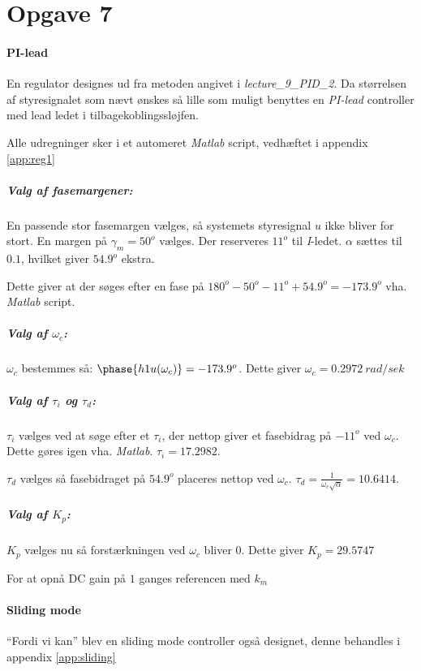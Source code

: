 \section{Opgave 7}
\paragraph{ PI-lead }
En regulator designes ud fra metoden angivet i \emph{lecture\_9\_PID\_2}. Da
størrelsen af styresignalet som nævt ønskes så lille som muligt benyttes en
\emph{PI-lead} controller med lead ledet i tilbagekoblingssløjfen.

Alle udregninger sker i et automeret \emph{Matlab} script, vedhæftet i appendix
\ref{app:reg1}

\subparagraph{Valg af fasemargener:}
	En passende stor fasemargen vælges, så systemets styresignal $u$ ikke bliver
	for stort. En margen på $\gamma_m = 50^o$ vælges.
	Der reserveres $11^o$ til \emph{I}-ledet.
	$\alpha$ sættes til $0.1$, hvilket giver $54.9^o$ ekstra.
	
	Dette giver at der søges efter en fase på $180^o - 50^o - 11^o + 54.9^o =
	-173.9^o$ vha. \emph{Matlab} script.
\subparagraph{Valg af $\omega_c$:}
	$\omega_c$ bestemmes så: $\phase{h1u(\omega_c)} = -173.9^o$. Dette giver
	$\omega_c =  0.2972~rad/sek$
\subparagraph{Valg af $\tau_i$ og $\tau_d$:}
	$\tau_i$ vælges ved at søge efter et $\tau_i$, der nettop giver et fasebidrag
	på $-11^o$ ved $\omega_c$. Dette gøres igen vha. \emph{Matlab}. $\tau_i =
	17.2982$.
	
	$\tau_d$ vælges så fasebidraget på $54.9^o$ placeres nettop ved $\omega_c$.
	$\tau_d = \frac{1}{\omega_c \sqrt{\alpha}} = 10.6414$.
\subparagraph{Valg af $K_p$:}
	$K_p$ vælges nu så forstærkningen ved $\omega_c$ bliver 0.
	Dette giver $K_p = 29.5747$
	
	For at opnå DC gain på $1$ ganges referencen med $k_m$
	
\paragraph{ Sliding mode }
	``Fordi vi kan'' blev en sliding mode controller også designet, denne
	behandles i appendix \ref{app:sliding}
